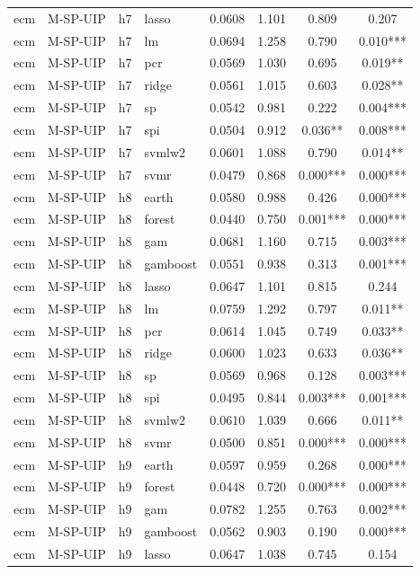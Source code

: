 \begin{ThreePartTable}
\begin{longtable}[t]{llclcccc}
ecm & M-SP-UIP & h7 & lasso & 0.0608 & 1.101 & 0.809 & 0.207\\
ecm & M-SP-UIP & h7 & lm & 0.0694 & 1.258 & 0.790 & 0.010***\\
ecm & M-SP-UIP & h7 & pcr & 0.0569 & 1.030 & 0.695 & 0.019**\\
ecm & M-SP-UIP & h7 & ridge & 0.0561 & 1.015 & 0.603 & 0.028**\\
ecm & M-SP-UIP & h7 & sp & 0.0542 & 0.981 & 0.222 & 0.004***\\
ecm & M-SP-UIP & h7 & spi & 0.0504 & 0.912 & 0.036** & 0.008***\\
ecm & M-SP-UIP & h7 & svmlw2 & 0.0601 & 1.088 & 0.790 & 0.014**\\
ecm & M-SP-UIP & h7 & svmr & 0.0479 & 0.868 & 0.000*** & 0.000***\\
\addlinespace
ecm & M-SP-UIP & h8 & earth & 0.0580 & 0.988 & 0.426 & 0.000***\\
ecm & M-SP-UIP & h8 & forest & 0.0440 & 0.750 & 0.001*** & 0.000***\\
ecm & M-SP-UIP & h8 & gam & 0.0681 & 1.160 & 0.715 & 0.003***\\
ecm & M-SP-UIP & h8 & gamboost & 0.0551 & 0.938 & 0.313 & 0.001***\\
ecm & M-SP-UIP & h8 & lasso & 0.0647 & 1.101 & 0.815 & 0.244\\
ecm & M-SP-UIP & h8 & lm & 0.0759 & 1.292 & 0.797 & 0.011**\\
ecm & M-SP-UIP & h8 & pcr & 0.0614 & 1.045 & 0.749 & 0.033**\\
ecm & M-SP-UIP & h8 & ridge & 0.0600 & 1.023 & 0.633 & 0.036**\\
ecm & M-SP-UIP & h8 & sp & 0.0569 & 0.968 & 0.128 & 0.003***\\
ecm & M-SP-UIP & h8 & spi & 0.0495 & 0.844 & 0.003*** & 0.001***\\
ecm & M-SP-UIP & h8 & svmlw2 & 0.0610 & 1.039 & 0.666 & 0.011**\\
ecm & M-SP-UIP & h8 & svmr & 0.0500 & 0.851 & 0.000*** & 0.000***\\
\addlinespace
ecm & M-SP-UIP & h9 & earth & 0.0597 & 0.959 & 0.268 & 0.000***\\
ecm & M-SP-UIP & h9 & forest & 0.0448 & 0.720 & 0.000*** & 0.000***\\
ecm & M-SP-UIP & h9 & gam & 0.0782 & 1.255 & 0.763 & 0.002***\\
ecm & M-SP-UIP & h9 & gamboost & 0.0562 & 0.903 & 0.190 & 0.000***\\
ecm & M-SP-UIP & h9 & lasso & 0.0647 & 1.038 & 0.745 & 0.154\\

\end{longtable}
\end{ThreePartTable}
